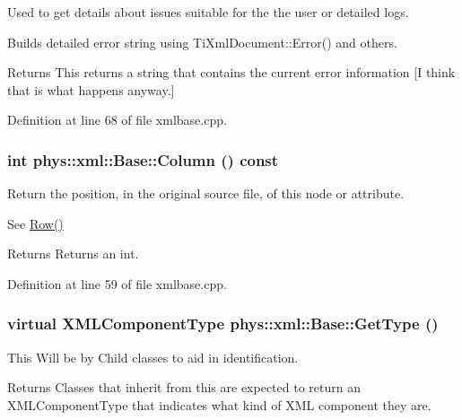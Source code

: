 Used to get details about issues suitable for the the user or detailed logs. 

Builds detailed error string using TiXmlDocument::Error() and others. \begin{DoxyReturn}{Returns}
This returns a string that contains the current error information \mbox{[}I think that is what happens anyway.\mbox{]} 
\end{DoxyReturn}


Definition at line 68 of file xmlbase.cpp.

\hypertarget{classphys_1_1xml_1_1Base_a7ef4a2c8165c6bb63f75fdc9f2231948}{
\subsubsection[{Column}]{\setlength{\rightskip}{0pt plus 5cm}int phys::xml::Base::Column () const}}
\label{df/d10/classphys_1_1xml_1_1Base_a7ef4a2c8165c6bb63f75fdc9f2231948}


Return the position, in the original source file, of this node or attribute. 

See \hyperlink{classphys_1_1xml_1_1Base_adc2f732f1f37ef7bae5b701a84470754}{Row()} \begin{DoxyReturn}{Returns}
Returns an int. 
\end{DoxyReturn}


Definition at line 59 of file xmlbase.cpp.

\hypertarget{classphys_1_1xml_1_1Base_af2821c239b5eb31c2524a499bf3ff19f}{
\subsubsection[{GetType}]{\setlength{\rightskip}{0pt plus 5cm}virtual {\bf XMLComponentType} phys::xml::Base::GetType ()}}
\label{df/d10/classphys_1_1xml_1_1Base_af2821c239b5eb31c2524a499bf3ff19f}


This Will be by Child classes to aid in identification. 

\begin{DoxyReturn}{Returns}
Classes that inherit from this are expected to return an XMLComponentType that indicates what kind of XML component they are. 
\end{DoxyReturn}


